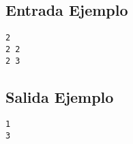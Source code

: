 \begin{multicols}{2}
\subsection*{Entrada Ejemplo}
\begin{verbatim}
2
2 2
2 3
\end{verbatim}
\columnbreak
\subsection*{Salida Ejemplo}
\begin{verbatim}
1
3
\end{verbatim}
\end{multicols}
